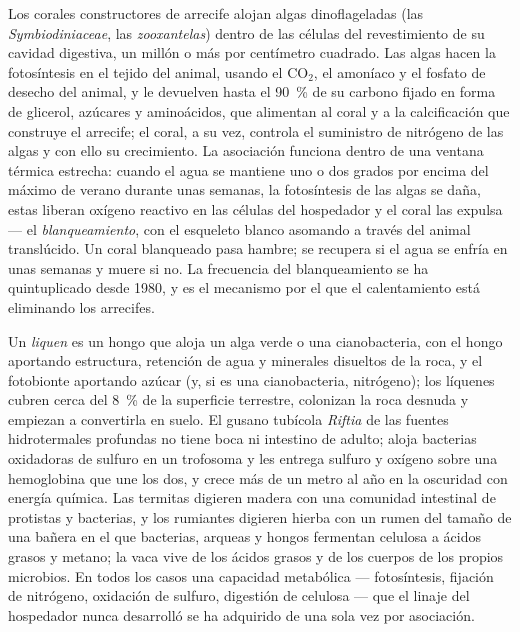 \begin{definition}\label{def:b3:microbiomes:coral}
Los corales constructores de arrecife alojan algas dinoflageladas (las
\emph{Symbiodiniaceae}, las \emph{zooxantelas}) dentro de las células del
revestimiento de su cavidad digestiva, un millón o más por centímetro
cuadrado. Las algas hacen la fotosíntesis en el tejido del animal, usando
el CO$_{2}$, el amoníaco y el fosfato de desecho del animal, y le
devuelven hasta el \qty{90}{\%} de su carbono fijado en forma de
glicerol, azúcares y aminoácidos, que alimentan al coral y a la
calcificación que construye el arrecife; el coral, a su vez, controla el
suministro de nitrógeno de las algas y con ello su crecimiento. La
asociación funciona dentro de una ventana térmica estrecha: cuando el
agua se mantiene uno o dos grados por encima del máximo de verano durante
unas semanas, la fotosíntesis de las algas se daña, estas liberan oxígeno
reactivo en las células del hospedador y el coral las expulsa --- el
\emph{blanqueamiento}, con el esqueleto blanco asomando a través del
animal translúcido. Un coral blanqueado pasa hambre; se recupera si el
agua se enfría en unas semanas y muere si no. La frecuencia del
blanqueamiento se ha quintuplicado desde 1980, y es el mecanismo por el
que el calentamiento está eliminando los arrecifes.
\end{definition}

\begin{example}\label{ex:b3:microbiomes:habitats}
Un \emph{liquen} es un hongo que aloja un alga verde o una
cianobacteria, con el hongo aportando estructura, retención de agua y
minerales disueltos de la roca, y el fotobionte aportando azúcar (y, si
es una cianobacteria, nitrógeno); los líquenes cubren cerca del
\qty{8}{\%} de la superficie terrestre, colonizan la roca desnuda y
empiezan a convertirla en suelo. El gusano tubícola \emph{Riftia} de las
fuentes hidrotermales profundas no tiene boca ni intestino de adulto;
aloja bacterias oxidadoras de sulfuro en un trofosoma y les entrega
sulfuro y oxígeno sobre una hemoglobina que une los dos, y crece más de
un metro al año en la oscuridad con energía química. Las termitas
digieren madera con una comunidad intestinal de protistas y bacterias, y
los rumiantes digieren hierba con un rumen del tamaño de una bañera en el
que bacterias, arqueas y hongos fermentan celulosa a ácidos grasos y
metano; la vaca vive de los ácidos grasos y de los cuerpos de los propios
microbios. En todos los casos una capacidad metabólica --- fotosíntesis,
fijación de nitrógeno, oxidación de sulfuro, digestión de celulosa ---
que el linaje del hospedador nunca desarrolló se ha adquirido de una sola
vez por asociación.
\end{example}

